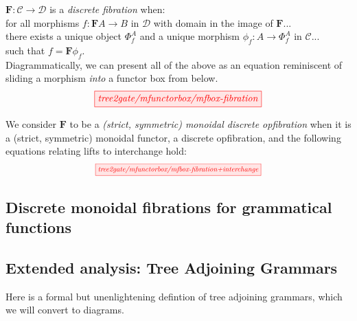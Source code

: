 \begin{fullwidth}
\begin{defn}
$\mathbf{F}: \mathcal{C} \rightarrow \mathcal{D}$ is a \emph{discrete fibration} when:\\
for all morphisms $f: \mathbf{F}A \rightarrow B$ in $\mathcal{D}$ with domain in the image of $\mathbf{F}$...\\
there exists a unique object $\Phi^A_f$ and a unique morphism $\phi_f: A \rightarrow \Phi^A_f$ in $\mathcal{C}$...\\
such that $f = \mathbf{F}\phi_f$.\\

Diagrammatically, we can present all of the above as an equation reminiscent of sliding a morphism \emph{into} a functor box from below.
\[\tikzfig{tree2gate/mfunctorbox/mfbox-fibration}\]
\end{defn}

\begin{defn}
We consider $\mathbf{F}$ to be a \emph{(strict, symmetric) monoidal discrete opfibration} when it is a (strict, symmetric) monoidal functor, a discrete opfibration, and the following equations relating lifts to interchange hold:
\[\scalebox{0.75}{\tikzfig{tree2gate/mfunctorbox/mfbox-fibration+interchange}}\]
\end{defn}

\subsection{Discrete monoidal fibrations for grammatical functions}

\subsection{Extended analysis: Tree Adjoining Grammars}

Here is a formal but unenlightening defintion of tree adjoining grammars, which we will convert to diagrams.


\end{fullwidth}
